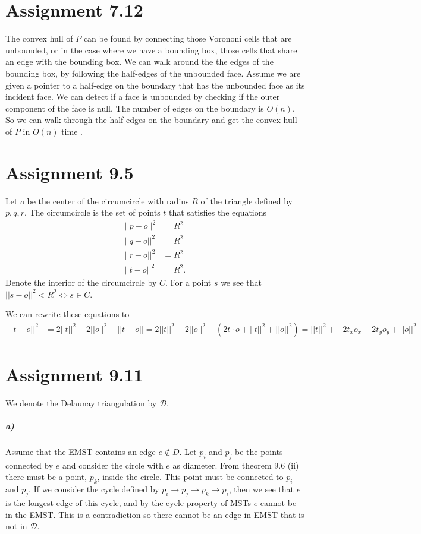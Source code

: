 \documentclass[10pt,a4paper,final,oneside,openany,article,oldfontcommands]{memoir}
\newcommand{\D}{\mathcal{D}}
\begin{document}
\chapter*{Assignment 7.12}
The convex hull of $P$ can be found by connecting those Vorononi cells that are unbounded, or in the case where we have a bounding box, those cells that share an edge with the bounding box. We can walk around the the edges of the bounding box, by following the half-edges of the unbounded face. Assume we are given a pointer to a half-edge on the boundary that has the unbounded face as its incident face. We can detect if a face is unbounded by checking if the outer component of the face is null. The number of edges on the boundary is $O(n)$. So we can walk through the half-edges on the boundary and get the convex hull of $P$ in $O(n)$ time .



\chapter*{Assignment 9.5}
Let $o$ be the center of the circumcircle with radius $R$ of the triangle defined by $p, q, r$. The circumcircle is the set of points $t$ that satisfies the equations
\begin{align*}
  ||p - o||^2 &= R^2\\
  ||q - o||^2 &= R^2\\
  ||r - o||^2 &= R^2\\
  ||t - o||^2 &= R^2.
\end{align*}
Denote the interior of the circumcircle by $C$. For a point $s$ we see that $||s - o||^2 < R^2 \iff s \in C$.

We can rewrite these equations to
\begin{align*}
  ||t - o||^2 &= 2||t||^2 + 2||o||^2 - ||t + o||
  = 2||t||^2 + 2||o||^2 - (2 t \cdot o + ||t||^2 + ||o||^2)
  = ||t||^2 +  -2t_xo_x - 2t_yo_y  + ||o||^2
\end{align*}


\chapter*{Assignment 9.11}
We denote the Delaunay triangulation by $\D$.
\paragraph{a)}
Assume that the EMST contains an edge $e \notin D$. Let $p_i$ and $p_j$ be the points connected by $e$ and consider the circle with $e$ as diameter. From theorem 9.6 (ii) there must be a point, $p_k$, inside the circle. This point must be connected to $p_i$ and $p_j$. If we consider the cycle defined by $p_i \to p_j \to p_k \to p_i$, then we see that $e$ is the longest edge of this cycle, and by the cycle property of MSTs $e$ cannot be in the EMST. This is a contradiction so there cannot be an edge in EMST that is not in $\D$.
\end{document}
